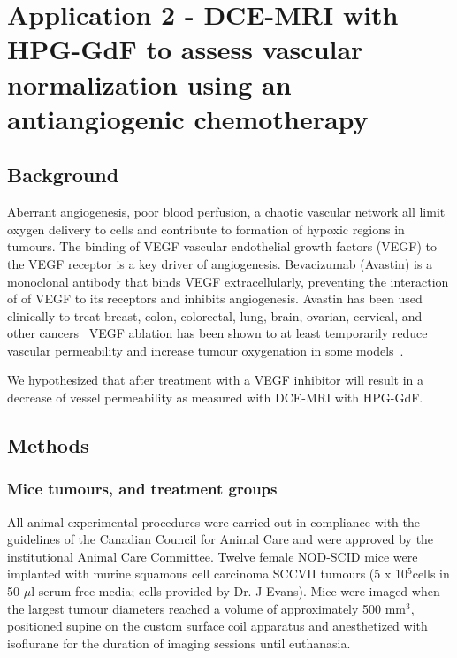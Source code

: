 \section{Application 2 - DCE-MRI with HPG-GdF to assess vascular normalization using an antiangiogenic chemotherapy}

\subsection{Background}
Aberrant angiogenesis, poor blood perfusion, a chaotic vascular network all limit oxygen delivery to cells and contribute to formation of hypoxic regions in tumours.
The binding of \ac{VEGF} vascular endothelial growth factors (VEGF) to the VEGF receptor is a key driver of angiogenesis.
Bevacizumab (Avastin) is a monoclonal antibody that binds VEGF extracellularly, preventing the interaction of of VEGF to its receptors and inhibits angiogenesis. 
Avastin has been used clinically to treat breast, colon, colorectal, lung, brain, ovarian, cervical, and other cancers~\cite{AvastinIndications}%
VEGF ablation has been shown to at least temporarily reduce vascular permeability and increase tumour oxygenation in some models~\cite{OConnor:2012iea}. 



We hypothesized that after treatment with a \ac{VEGF} inhibitor will result in a decrease of vessel permeability as measured with DCE-MRI with HPG-GdF.

\subsection{Methods}
\subsubsection{Mice tumours, and treatment groups}

All animal experimental procedures were carried out in compliance with the guidelines of the Canadian Council for Animal Care and were approved by the institutional Animal Care Committee. 
Twelve female NOD-SCID mice were implanted with murine squamous cell carcinoma SCCVII tumours (5 x 10$^5 $cells in 50 $\mu$l serum-free media; cells provided by Dr. J Evans).
Mice were imaged when the largest tumour diameters reached a volume of approximately 500 mm$^3$, positioned supine on the custom surface coil apparatus and anesthetized with isoflurane for the duration of imaging sessions until euthanasia.

